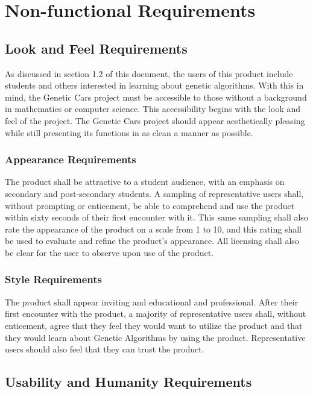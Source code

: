 \documentclass[12pt, titlepage]{article}
\begin{document}

\section{Non-functional Requirements}

\subsection{Look and Feel Requirements}

As discussed in section 1.2 of this document, the users of this product include 
students and others interested in learning about genetic algorithms. With this 
in mind, the Genetic Cars project must be accessible to those without a 
background in mathematics or computer science. This accessibility begins with 
the look and feel of the project. The Genetic Cars project should appear 
aesthetically pleasing while still presenting its functions in as clean a manner 
as possible.

\subsubsection{Appearance Requirements}

The product shall be attractive to a student audience, with an emphasis on 
secondary and post-secondary students. A sampling of representative users shall, 
without prompting or enticement, be able to comprehend and use the product 
within sixty seconds of their first encounter with it. This same sampling shall 
also rate the appearance of the product on a scale from 1 to 10, and this rating 
shall be used to evaluate and refine the product's appearance. All licensing 
shall also be clear for the user to observe upon use of the product.

\subsubsection{Style Requirements}

The product shall appear inviting and educational and professional. After their 
first encounter with the product, a majority of representative users shall, 
without enticement, agree that they feel they would want to utilize the product 
and that they would learn about Genetic Algorithms by using the product. 
Representative users should also feel that they can trust the product.

\subsection{Usability and Humanity Requirements}
\end{document}

